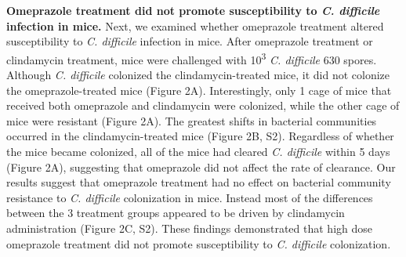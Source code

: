 \documentclass[11pt,]{article}
\begin{document}
\textbf{Omeprazole treatment did not promote susceptibility to \emph{C.
difficile} infection in mice.} Next, we examined whether omeprazole
treatment altered susceptibility to \emph{C. difficile} infection in
mice. After omeprazole treatment or clindamycin treatment, mice were
challenged with 10\textsuperscript{3} \emph{C. difficile} 630 spores.
Although \emph{C. difficile} colonized the clindamycin-treated mice, it
did not colonize the omeprazole-treated mice (Figure 2A). Interestingly,
only 1 cage of mice that received both omeprazole and clindamycin were
colonized, while the other cage of mice were resistant (Figure 2A). The
greatest shifts in bacterial communities occurred in the
clindamycin-treated mice (Figure 2B, S2). Regardless of whether the mice
became colonized, all of the mice had cleared \emph{C. difficile} within
5 days (Figure 2A), suggesting that omeprazole did not affect the rate
of clearance. Our results suggest that omeprazole treatment had no
effect on bacterial community resistance to \emph{C. difficile}
colonization in mice. Instead most of the differences between the 3
treatment groups appeared to be driven by clindamycin administration
(Figure 2C, S2). These findings demonstrated that high dose omeprazole
treatment did not promote susceptibility to \emph{C. difficile}
colonization.
\end{document}
